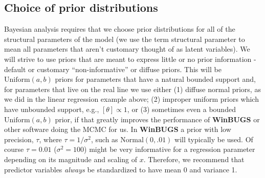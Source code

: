 \subsection{Choice of prior distributions}

Bayesian analysis requires that we choose prior distributions for all
of the structural parameters of the model (we use the term structural
parameter to mean all parameters that aren't customary thought of as
latent variables). We will strive to use priors that are meant to
express little or no prior information - default or customary
``non-informative'' or diffuse priors. This will be
$\mbox{Uniform}(a,b)$ priors for parameters that have a natural
bounded support and, for parameters that live on the real line we use
either (1) diffuse normal priors, as we did in the linear regression example above; (2) improper uniform priors which
have unbounded support, e.g., $[\theta] \propto 1$, or (3) sometimes
even a bounded $\mbox{Uniform}(a,b)$ prior, if that greatly improves
the performance of {\bf WinBUGS} or other software doing the MCMC for
us.  In {\bf WinBUGS} a prior with low precision, $\tau$, where $\tau
= 1/\sigma^2$, such as $\mbox{Normal}(0,.01)$ will typically be
used. Of course $\tau = 0.01$ ($\sigma^{2} = 100$) might be very
informative for a regression parameter depending on its magnitude and
scaling of $x$.  Therefore, we recommend that predictor variables {\it
  always} be standardized to have mean 0 and variance 1. 

